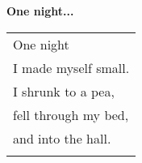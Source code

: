 \documentclass{article}
\begin{document}
\newcommand{\hh}{\hspace{2ex}}
\begin{center}
\textbf{One night...} \\\vspace*{3ex}
\begin{tabular}{l}
\\
One night \\
I made myself small. \\
I shrunk to a pea, \\
fell through my bed, \\
and into the hall. \\
\\
\end{tabular}
\end{center}
\end{document}
